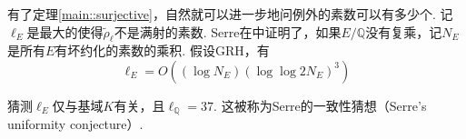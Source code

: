 有了定理\ref{main::surjective}，自然就可以进一步地问例外的素数可以有多少个.
记$\ell_{E}$是最大的使得$\tilde{\rho}_{\ell}$不是满射的素数.
Serre在\parencite{serre1981quelques}中证明了，如果$E/\mathbb{Q}$没有复乘，记$N_E$是所有$E$有坏约化的素数的乘积.
假设GRH，有
\begin{equation}
    \ell_{E} = O((\log N_E)(\log \log 2N_E)^3)
\end{equation}

猜测$\ell_{E}$仅与基域$K$有关，且$\ell_{\mathbb{Q}}=37$.
这被称为Serre的一致性猜想（Serre's uniformity conjecture）.

